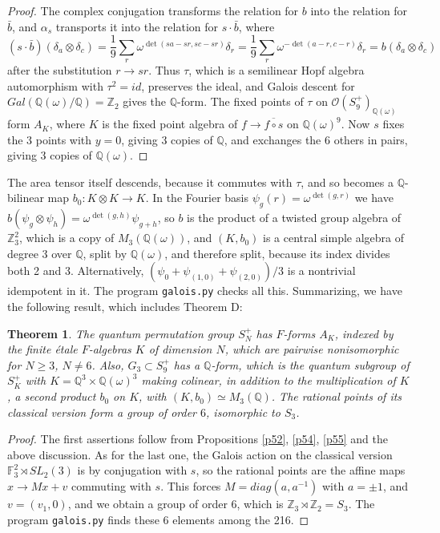 \documentclass[11pt]{amsart}
\newtheorem{theorem}{Theorem}[section]
\theoremstyle{definition}
\begin{document}
\begin{proof}
The complex conjugation transforms the relation for $b$ into the relation for $\bar b$, and $\alpha_s$ transports it into the relation for $s\cdot\bar b$, where
$$(s\cdot\bar b)(\delta_a\otimes\delta_c)=\frac{1}{9}\sum_r\omega^{\det(sa-sr,sc-sr)}\delta_{r}=\frac{1}{9}\sum_r\omega^{-\det(a-r,c-r)}\delta_r=b(\delta_a\otimes\delta_c)$$
after the substitution $r\to sr$. Thus $\tau$, which is a semilinear Hopf algebra automorphism with $\tau^2=id$, preserves the ideal, and Galois descent for $Gal(\mathbb Q(\omega)/\mathbb Q)=\mathbb Z_2$ gives the $\mathbb Q$-form. The fixed points of $\tau$ on $\mathcal O(S_9^+)_{\mathbb Q(\omega)}$ form $A_K$, where $K$ is the fixed point algebra of $f\to\overline{f\circ s}$ on $\mathbb Q(\omega)^9$. Now $s$ fixes the 3 points with $y=0$, giving 3 copies of $\mathbb Q$, and exchanges the 6 others in pairs, giving 3 copies of $\mathbb Q(\omega)$.
\end{proof}

The area tensor itself descends, because it commutes with $\tau$, and so becomes a $\mathbb Q$-bilinear map $b_0:K\otimes K\to K$. In the Fourier basis $\psi_g(r)=\omega^{\det(g,r)}$ we have $b(\psi_g\otimes\psi_h)=\omega^{\det(g,h)}\psi_{g+h}$, so $b$ is the product of a twisted group algebra of $\mathbb Z_3^2$, which is a copy of $M_3(\mathbb Q(\omega))$, and $(K,b_0)$ is a central simple algebra of degree 3 over $\mathbb Q$, split by $\mathbb Q(\omega)$, and therefore split, because its index divides both 2 and 3. Alternatively, $(\psi_0+\psi_{(1,0)}+\psi_{(2,0)})/3$ is a nontrivial idempotent in it. The program {\tt galois.py} checks all this. Summarizing, we have the following result, which includes Theorem D:

\begin{theorem}
\label{t56}
The quantum permutation group $S_N^+$ has $F$-forms $A_K$, indexed by the finite étale $F$-algebras $K$ of dimension $N$, which are pairwise nonisomorphic for $N\geq3$, $N\neq6$. Also, $G_3\subset S_9^+$ has a $\mathbb Q$-form, which is the quantum subgroup of $S_K^+$ with $K=\mathbb Q^3\times\mathbb Q(\omega)^3$ making colinear, in addition to the multiplication of $K$, a second product $b_0$ on $K$, with $(K,b_0)\simeq M_3(\mathbb Q)$. The rational points of its classical version form a group of order $6$, isomorphic to $S_3$.
\end{theorem}

\begin{proof}
The first assertions follow from Propositions \ref{p52}, \ref{p54}, \ref{p55} and the above discussion. As for the last one, the Galois action on the classical version $\mathbb F_3^2\rtimes SL_2(3)$ is by conjugation with $s$, so the rational points are the affine maps $x\to Mx+v$ commuting with $s$. This forces $M=diag(a,a^{-1})$ with $a=\pm1$, and $v=(v_1,0)$, and we obtain a group of order 6, which is $\mathbb Z_3\rtimes\mathbb Z_2=S_3$. The program {\tt galois.py} finds these 6 elements among the 216.
\end{proof}
\end{document}
